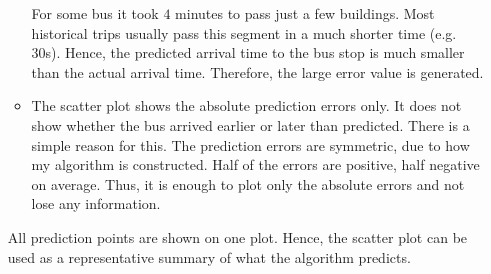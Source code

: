 \documentclass[12pt,a4paper,oneside,openright]{report}
\begin{document}
\begin{itemize}
\begin{itemize}
    For some bus it took $4$ minutes to pass just a few buildings. Most
    historical trips usually pass this segment in a much shorter
    time (e.g. 30s). Hence, the predicted arrival time to the bus stop is
    much smaller than the actual arrival time. Therefore, the large error value 
    is generated.

    \item
    The scatter plot shows the absolute prediction errors only. It does not show whether
    the bus arrived earlier or later than predicted. There is a simple reason for
    this. The prediction errors are symmetric, due to how my algorithm is constructed.
    Half of the errors are positive, half negative on average. Thus, it is
    enough to plot only the absolute errors and not lose any information.

\end{itemize}

All prediction points are shown on one plot. Hence, the scatter plot can be
used as a representative summary of what the algorithm predicts.


\end{itemize}
\end{document}
